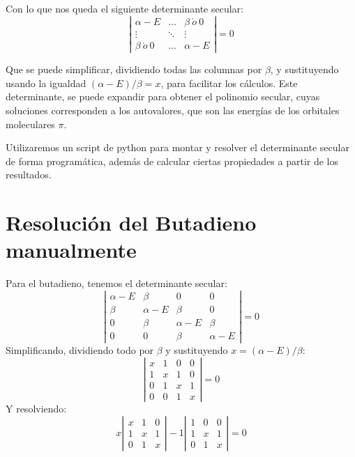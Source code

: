 \documentclass[12pt]{article}
\begin{document}
Con lo que nos queda el siguiente determinante secular:
\[
\left| \begin{array}{ccc} 
    \alpha-E & \hdots &   \beta\ \acute{o}\ 0 \\ 
    \vdots & \ddots &   \vdots \\
    \beta\ \acute{o}\ 0 & \hdots  &   \alpha-E
\end{array} \right|
=0
\]

Que se puede simplificar, dividiendo todas las columnas por $\beta$, y sustituyendo usando la igualdad $\left(\alpha - E\right)/\beta = x $, para facilitar los cálculos.
Este determinante, se puede expandir para obtener el polinomio secular, cuyas soluciones corresponden a los autovalores, que son las energías de los orbitales moleculares $\pi$. \cite{yates}

Utilizaremos un script de python para montar y resolver el determinante secular de forma programática, además de calcular ciertas propiedades a partir de los resultados.






\newpage
\section{Resolución del Butadieno manualmente}
Para el butadieno, tenemos el determinante secular:
\[
\left| \begin{array}{cccc} 
    \alpha-E & \beta    & 0         & 0         \\
    \beta    & \alpha-E & \beta     & 0         \\
    0        & \beta    & \alpha-E  & \beta     \\
    0        & 0        & \beta     & \alpha-E
\end{array} \right|
=0
\]
Simplificando, dividiendo todo por $\beta$ y sustituyendo $x = \left(\alpha - E\right)/\beta$:
\[
\left| \begin{array}{cccc} 
    x & 1 & 0 & 0 \\
    1 & x & 1 & 0 \\
    0 & 1 & x & 1 \\
    0 & 0 & 1 & x
\end{array} \right|
=0
\]
Y resolviendo:
\[
    x \left| \begin{array}{ccc}
        x & 1 & 0 \\
        1 & x & 1 \\
        0 & 1 & x
    \end{array} \right|
    - 1 \left| \begin{array}{ccc}
        1 & 0 & 0 \\
        1 & x & 1 \\
        0 & 1 & x
    \end{array} \right|
    =0
\]
\end{document}
